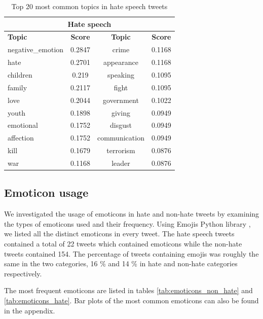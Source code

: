 \documentclass[conference]{IEEEtran}
\begin{document}
  \begin{table}[!ht]
    \def\arraystretch{1.2}%
    \begin{center}
      \caption{Top 20 most common topics in hate speech tweets}
      \label{tab:liwc_features_hate}
      \begin{tabular}{l c | c c}
        \hline\hline
        \multicolumn{4}{c}{\textbf{Hate speech}}\\
        \hline
        \textbf{Topic}&\textbf{Score}&\textbf{Topic}&\textbf{Score}\\
        \hline
        negative\_emotion&0.2847&crime&0.1168\\
        hate&0.2701&appearance&0.1168\\
        children&0.219&speaking&0.1095\\
        family&0.2117&fight&0.1095\\
        love&0.2044&government&0.1022\\
        youth&0.1898&giving&0.0949\\
        emotional&0.1752&disgust&0.0949\\
        affection&0.1752&communication&0.0949\\
        kill&0.1679&terrorism&0.0876\\
        war&0.1168&leader&0.0876\\
        \hline\hline
      \end{tabular}  
    \end{center}
  \end{table}
\subsection{Emoticon usage}
We investigated the usage of emoticons in hate and non-hate tweets by examining the types 
of emoticons used and their frequency.  Using Emojis Python library \cite{python:emojis}, we 
listed all the distinct emoticons in every tweet. The hate speech tweets contained a total of 22 tweets which contained emoticons
while the  non-hate tweets contained 154. The percentage of tweets containing emojis was 
roughly the same in the two categories, 16 \% and 14 \% in hate and non-hate categories respectively.

The most frequent emoticons are listed in tables \ref{tab:emoticons_non_hate} and \ref{tab:emoticons_hate}. 
Bar plots of the most common emoticons can also be found in the appendix.
\end{document}
